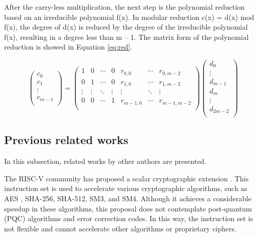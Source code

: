 After the carry-less multiplication, the next step is the polynomial reduction based on an 
irreducible polynomial f(x). In modular reduction c(x) = d(x) mod f(x), the degree of d(x) is 
reduced by the degree of the irreducible polynomial f(x), resulting in a degree less than m – 1.
The matrix form of the polynomial reduction is showed in Equation \ref{eq:red}.


\begin{equation}\label{eq:red}
    \begin{pmatrix}
        c_{0} \\
        c_{1} \\
        \vdots \\
        c_{m-1} \\
    \end{pmatrix}
    =
    \begin{pmatrix}
        1 & 0 & \cdots & 0 & r_{0,0} & \cdots & r_{0,m-2} \\
        0 & 1 & \cdots & 0 & r_{1,0} & \cdots & r_{1,m-2} \\
        \vdots & \vdots & \ddots & \vdots & \vdots & \ddots & \vdots \\
        0 & 0 & \cdots & 1 & r_{m-1,0} & \cdots & r_{m-1,m-2} \\
    \end{pmatrix}
    \begin{pmatrix}
        d_{0} \\
        \vdots \\
        d_{m-1} \\
        d_{m} \\
        \vdots \\
        d_{2m-2} \\
    \end{pmatrix}
\end{equation}


\subsection{Previous related works}

In this subsection, related works by other authors are presented.

The RISC-V community has proposed a scalar cryptographic extension \cite{zehrisc}. This instruction set 
is used to accelerate various cryptographic algorithms, such as AES \cite{Marshall_Newell_Page_Saarinen_Wolf_2020}, SHA-256, SHA-512, SM3, and SM4. 
Although it achieves a considerable speedup in these algorithms, this proposal does not contemplate 
post-quantum (PQC) algorithms and error correction codes. In this way, the instruction set is not flexible 
and cannot accelerate other algorithms or proprietary ciphers.

